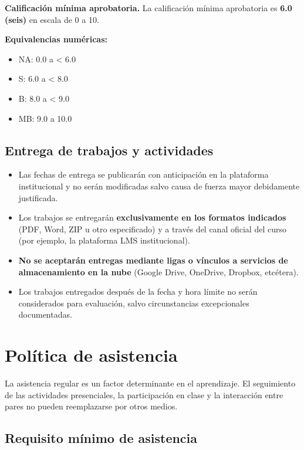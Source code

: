 \documentclass[12pt]{article}
\begin{document}
	\vspace{0.5em}
	
	\noindent\textbf{Calificación mínima aprobatoria.} La calificación mínima aprobatoria es \textbf{6.0 (seis)} en escala de 0 a 10.
	
	\noindent\textbf{Equivalencias numéricas:}
	\begin{itemize}
		\item NA: 0.0 a < 6.0
		\item S: 6.0 a < 8.0
		\item B: 8.0 a < 9.0
		\item MB: 9.0 a 10.0
	\end{itemize}
	
	\subsection*{Entrega de trabajos y actividades}
	
	\begin{itemize}
		\item Las fechas de entrega se publicarán con anticipación en la plataforma institucional y no serán modificadas salvo causa de fuerza mayor debidamente justificada.
		\item Los trabajos se entregarán \textbf{exclusivamente en los formatos indicados} (PDF, Word, ZIP u otro especificado) y a través del canal oficial del curso (por ejemplo, la plataforma LMS institucional).
		\item \textbf{No se aceptarán entregas mediante ligas o vínculos a servicios de almacenamiento en la nube} (Google Drive, OneDrive, Dropbox, etcétera).
		\item Los trabajos entregados después de la fecha y hora límite no serán considerados para evaluación, salvo circunstancias excepcionales documentadas.
	\end{itemize}
	
	\section*{Política de asistencia}
	
	La asistencia regular es un factor determinante en el aprendizaje. El seguimiento de las actividades presenciales, la participación en clase y la interacción entre pares no pueden reemplazarse por otros medios.
	
	\subsection*{Requisito mínimo de asistencia}
	
\end{document}

